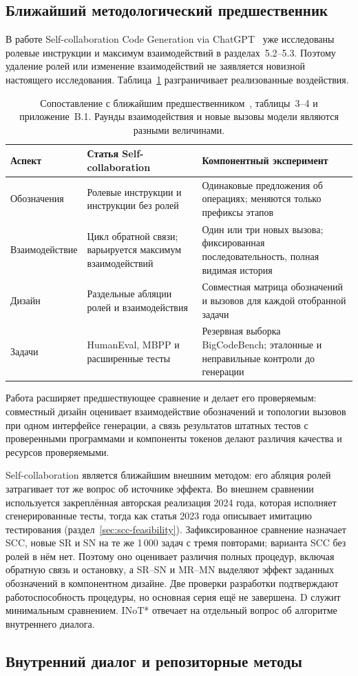 \subsection{Ближайший методологический предшественник}
В работе Self-collaboration Code Generation via ChatGPT~\cite{dong2023selfcollaboration} уже исследованы ролевые инструкции и максимум взаимодействий в разделах~5.2--5.3. Поэтому удаление ролей или изменение взаимодействий не заявляется новизной настоящего исследования. Таблица~\ref{tab:closest-method} разграничивает реализованные воздействия.

\begin{table}[htbp]\centering\small
\caption{Сопоставление с ближайшим предшественником~\cite{dong2023selfcollaboration}, таблицы~3--4 и приложение~B.1. Раунды взаимодействия и новые вызовы модели являются разными величинами.}\label{tab:closest-method}
\begin{tabular}{p{}p{}p{}}\toprule
Аспект & Статья Self-collaboration & Компонентный эксперимент\\\midrule
Обозначения & Ролевые инструкции и инструкции без ролей & Одинаковые предложения об операциях; меняются только префиксы этапов\\
Взаимодействие & Цикл обратной связи; варьируется максимум взаимодействий & Один или три новых вызова; фиксированная последовательность, полная видимая история\\
Дизайн & Раздельные абляции ролей и взаимодействия & Совместная матрица обозначений и вызовов для каждой отобранной задачи\\
Задачи & HumanEval, MBPP и расширенные тесты & Резервная выборка BigCodeBench; эталонные и неправильные контроли до генерации\\\bottomrule
\end{tabular}\end{table}

Работа расширяет предшествующее сравнение и делает его проверяемым: совместный дизайн оценивает взаимодействие обозначений и топологии вызовов при одном интерфейсе генерации, а связь результатов штатных тестов с проверенными программами и компоненты токенов делают различия качества и ресурсов проверяемыми.

Self-collaboration является ближайшим внешним методом: его абляция ролей затрагивает тот же вопрос об источнике эффекта. Во внешнем сравнении используется закреплённая авторская реализация 2024 года, которая исполняет сгенерированные тесты, тогда как статья 2023 года описывает имитацию тестирования (раздел~\ref{sec:scc-feasibility}). Зафиксированное сравнение назначает SCC, новые SR и SN на те же 1\,000 задач с тремя повторами; варианта SCC без ролей в нём нет. Поэтому оно оценивает различия полных процедур, включая обратную связь и остановку, а SR--SN и MR--MN выделяют эффект заданных обозначений в компонентном дизайне. Две проверки разработки подтверждают работоспособность процедуры, но основная серия ещё не завершена. D служит минимальным сравнением. INoT* отвечает на отдельный вопрос об алгоритме внутреннего диалога.

\subsection{Внутренний диалог и репозиторные методы}
